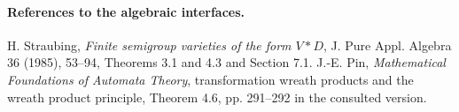 \documentclass[11pt]{article}
\begin{document}
\paragraph{References to the algebraic interfaces.}
H. Straubing, \emph{Finite semigroup varieties of the form $V*D$},
J. Pure Appl. Algebra 36 (1985), 53--94, Theorems 3.1 and 4.3 and
Section 7.1. J.-E. Pin, \emph{Mathematical Foundations of Automata
Theory}, transformation wreath products and the wreath product principle,
Theorem 4.6, pp. 291--292 in the consulted version.
\ifdefined\RDecorationFragment\else\expandafter\enddocument\fi
\end{document}
